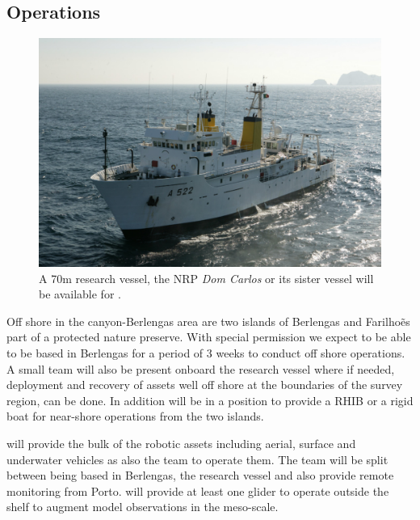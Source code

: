 \subsection{\proj Operations}
 

\begin{figure}
  \vspace{-0.8cm}
  \centering
  \includegraphics[scale=1.75]{fig/dom-carlos.jpg}
  \caption{A 70m research vessel, the NRP \emph{Dom Carlos} or its
    sister vessel will be available for \proje.}
 \label{fig:vessel}
\end{figure}

Off shore in the \naz canyon-Berlengas area are two islands of Berlengas
and Farilho\~es part of a protected nature preserve. With special
permission we expect to be able to be based in Berlengas for a period of
3 weeks to conduct off shore operations. A small team will also be
present onboard the \inst research vessel where if needed, deployment
and recovery of assets well off shore at the boundaries of the survey
region, can be done. In addition \inst will be in a position to provide
a RHIB or a rigid boat for near-shore operations from the two islands.

\univ will provide the bulk of the robotic assets including aerial,
surface and underwater vehicles as also the team to operate them. The
team will be split between being based in Berlengas, the research vessel
and also provide remote monitoring from Porto. \soc will provide at
least one glider to operate outside the shelf to augment model
observations in the meso-scale.

